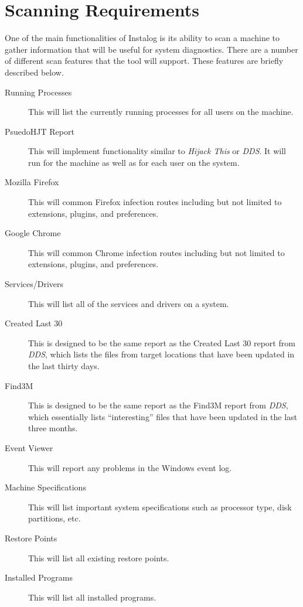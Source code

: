 \documentclass[letterpaper,12pt]{article}
\begin{document}
\newpage



\section{Scanning Requirements} \label{scanning}
One of the main functionalities of Instalog is its ability to scan a machine to
gather information that will be useful for system diagnostics.  There are a
number of different scan features that the tool will support.  These features
are briefly described below.

\begin{description}
    \item[Running Processes] This will list the currently running processes for
    all users on the machine.
    \item[PsuedoHJT Report] This will implement functionality similar to
    \textit{Hijack This} or \textit{DDS}.  It will run for the machine as well
    as for each user on the system.
    \item[Mozilla Firefox] This will common Firefox infection routes including
    but not limited to extensions, plugins, and preferences.
    \item[Google Chrome] This will common Chrome infection routes including
    but not limited to extensions, plugins, and preferences.
    \item[Services/Drivers] This will list all of the services and drivers on a
    system.
    \item[Created Last 30] This is designed to be the same report as the Created
    Last 30 report from \textit{DDS}, which lists the files from target
    locations that have been updated in the last thirty days.
    \item[Find3M] This is designed to be the same report as the Find3M report
    from \textit{DDS}, which essentially lists ``interesting'' files that have
    been updated in the last three months.
    \item[Event Viewer] This will report any problems in the Windows event log.
    \item[Machine Specifications] This will list important system specifications
    such as processor type, disk partitions, etc.
    \item[Restore Points] This will list all existing restore points.
    \item[Installed Programs] This will list all installed programs.
\end{description}
\end{document}

